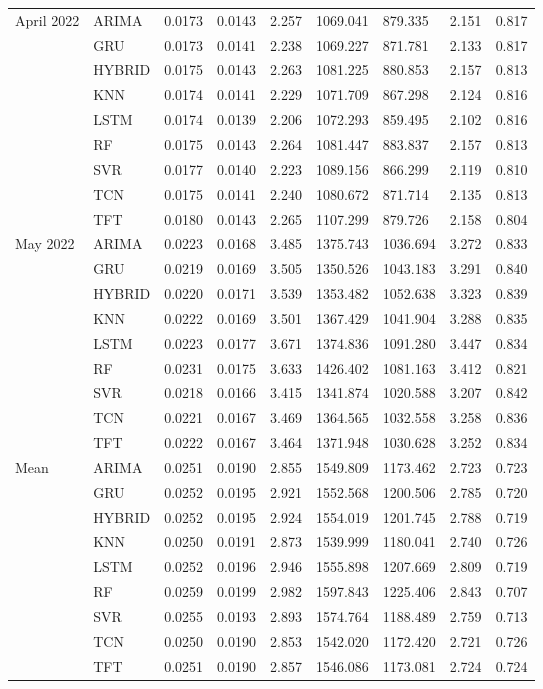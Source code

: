 \begin{tabular}{lllllllll}
April 2022 & ARIMA & 0.0173 & 0.0143 & 2.257 & 1069.041 & 879.335 & 2.151 & 0.817 \\
 & GRU & 0.0173 & 0.0141 & 2.238 & 1069.227 & 871.781 & 2.133 & 0.817 \\
 & HYBRID & 0.0175 & 0.0143 & 2.263 & 1081.225 & 880.853 & 2.157 & 0.813 \\
 & KNN & 0.0174 & 0.0141 & 2.229 & 1071.709 & 867.298 & 2.124 & 0.816 \\
 & LSTM & 0.0174 & 0.0139 & 2.206 & 1072.293 & 859.495 & 2.102 & 0.816 \\
 & RF & 0.0175 & 0.0143 & 2.264 & 1081.447 & 883.837 & 2.157 & 0.813 \\
 & SVR & 0.0177 & 0.0140 & 2.223 & 1089.156 & 866.299 & 2.119 & 0.810 \\
 & TCN & 0.0175 & 0.0141 & 2.240 & 1080.672 & 871.714 & 2.135 & 0.813 \\
 & TFT & 0.0180 & 0.0143 & 2.265 & 1107.299 & 879.726 & 2.158 & 0.804 \\
May 2022 & ARIMA & 0.0223 & 0.0168 & 3.485 & 1375.743 & 1036.694 & 3.272 & 0.833 \\
 & GRU & 0.0219 & 0.0169 & 3.505 & 1350.526 & 1043.183 & 3.291 & 0.840 \\
 & HYBRID & 0.0220 & 0.0171 & 3.539 & 1353.482 & 1052.638 & 3.323 & 0.839 \\
 & KNN & 0.0222 & 0.0169 & 3.501 & 1367.429 & 1041.904 & 3.288 & 0.835 \\
 & LSTM & 0.0223 & 0.0177 & 3.671 & 1374.836 & 1091.280 & 3.447 & 0.834 \\
 & RF & 0.0231 & 0.0175 & 3.633 & 1426.402 & 1081.163 & 3.412 & 0.821 \\
 & SVR & 0.0218 & 0.0166 & 3.415 & 1341.874 & 1020.588 & 3.207 & 0.842 \\
 & TCN & 0.0221 & 0.0167 & 3.469 & 1364.565 & 1032.558 & 3.258 & 0.836 \\
 & TFT & 0.0222 & 0.0167 & 3.464 & 1371.948 & 1030.628 & 3.252 & 0.834 \\
Mean & ARIMA & 0.0251 & 0.0190 & 2.855 & 1549.809 & 1173.462 & 2.723 & 0.723 \\
 & GRU & 0.0252 & 0.0195 & 2.921 & 1552.568 & 1200.506 & 2.785 & 0.720 \\
 & HYBRID & 0.0252 & 0.0195 & 2.924 & 1554.019 & 1201.745 & 2.788 & 0.719 \\
 & KNN & 0.0250 & 0.0191 & 2.873 & 1539.999 & 1180.041 & 2.740 & 0.726 \\
 & LSTM & 0.0252 & 0.0196 & 2.946 & 1555.898 & 1207.669 & 2.809 & 0.719 \\
 & RF & 0.0259 & 0.0199 & 2.982 & 1597.843 & 1225.406 & 2.843 & 0.707 \\
 & SVR & 0.0255 & 0.0193 & 2.893 & 1574.764 & 1188.489 & 2.759 & 0.713 \\
 & TCN & 0.0250 & 0.0190 & 2.853 & 1542.020 & 1172.420 & 2.721 & 0.726 \\
 & TFT & 0.0251 & 0.0190 & 2.857 & 1546.086 & 1173.081 & 2.724 & 0.724 \\
\bottomrule
\end{tabular}

